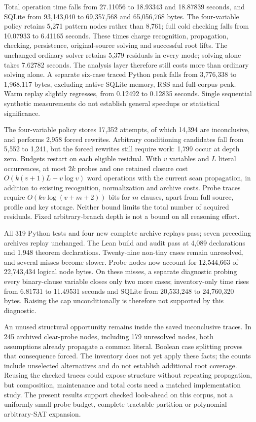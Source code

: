 \documentclass[11pt,a4paper]{article}
\numberwithin{equation}{section}
\theoremstyle{plain}
\theoremstyle{definition}
\theoremstyle{remark}
\begin{document}
Total operation time falls from 27.11056 to 18.93343 and 18.87839 seconds, and SQLite from 93,143,040 to 69,357,568 and 65,056,768 bytes. The four-variable policy retains 5,271 pattern nodes rather than 8,761; full cold checking falls from 10.07933 to 6.41165 seconds. These times charge recognition, propagation, checking, persistence, original-source solving and successful root lifts. The unchanged ordinary solver retains 5,379 residuals in every mode; solving alone takes 7.62782 seconds. The analysis layer therefore still costs more than ordinary solving alone. A separate six-case traced Python peak falls from 3,776,338 to 1,968,117 bytes, excluding native SQLite memory, RSS and full-corpus peak. Warm replay slightly regresses, from 0.12492 to 0.12835 seconds. Single sequential synthetic measurements do not establish general speedups or statistical significance.

The four-variable policy stores 17,352 attempts, of which 14,394 are inconclusive, and performs 2,958 forced rewrites. Arbitrary conditioning candidates fall from 5,552 to 1,241, but the forced rewrites still require work: 1,799 occur at depth zero. Budgets restart on each eligible residual. With $v$ variables and $L$ literal occurrences, at most $2k$ probes and one retained closure cost $O(k(v+1)L+v\log v)$ word operations with the current scan propagation, in addition to existing recognition, normalization and archive costs. Probe traces require $O(kv\log(v+m+2))$ bits for $m$ clauses, apart from full source, profile and key storage. Neither bound limits the total number of acquired residuals. Fixed arbitrary-branch depth is not a bound on all reasoning effort.

All 319 Python tests and four new complete archive replays pass; seven preceding archives replay unchanged. The Lean build and audit pass at 4,089 declarations and 1,948 theorem declarations. Twenty-nine non-tiny cases remain unresolved, and several misses become slower. Probe nodes now account for 12,544,663 of 22,743,434 logical node bytes. On these misses, a separate diagnostic probing every binary-clause variable closes only two more cases; inventory-only time rises from 6.81731 to 11.49531 seconds and SQLite from 20,533,248 to 24,760,320 bytes. Raising the cap unconditionally is therefore not supported by this diagnostic.

An unused structural opportunity remains inside the saved inconclusive traces. In 245 archived clear-probe nodes, including 179 unresolved nodes, both assumptions already propagate a common literal. Boolean case splitting proves that consequence forced. The inventory does not yet apply these facts; the counts include unselected alternatives and do not establish additional root coverage. Reusing the checked traces could expose structure without repeating propagation, but composition, maintenance and total costs need a matched implementation study. The present results support checked look-ahead on this corpus, not a uniformly small probe budget, complete tractable partition or polynomial arbitrary-SAT expansion.
\end{document}
